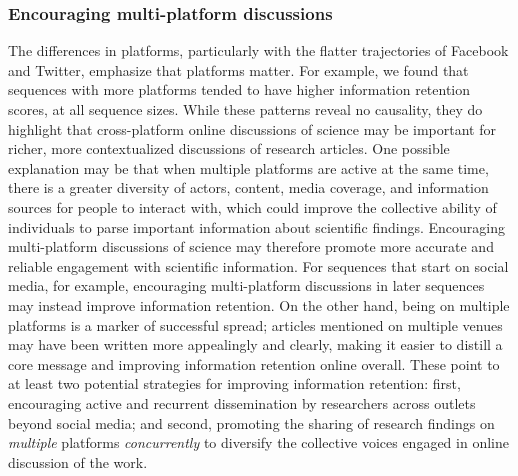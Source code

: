 \documentclass[letterpaper]{article} %
\begin{document}
\subsubsection{Encouraging multi-platform discussions}
The differences in platforms, particularly with the flatter trajectories of Facebook and Twitter, emphasize that platforms matter. For example, we found that sequences with more platforms tended to have higher information retention scores, at all sequence sizes. While these patterns reveal no causality, they do highlight that cross-platform online discussions of science may be important for richer, more contextualized discussions of research articles. One possible explanation may be that when multiple platforms are active at the same time, there is a greater diversity of actors, content, media coverage, and information sources for people to interact with, which could improve the collective ability of individuals to parse important information about scientific findings.
Encouraging multi-platform discussions of science may therefore promote more accurate and reliable engagement with scientific information. For sequences that start on social media, for example, encouraging multi-platform discussions in later sequences may instead improve information retention.
On the other hand, being on multiple platforms is a marker of successful spread; articles mentioned on multiple venues may have been written more appealingly and clearly, making it easier to distill a core message and improving information retention online overall.
These point to at least two potential strategies for improving information retention: first, encouraging active and recurrent dissemination by researchers across outlets beyond social media; and second, promoting the sharing of research findings on \textit{multiple} platforms \textit{concurrently} to diversify the collective voices engaged in online discussion of the work.
\end{document}
